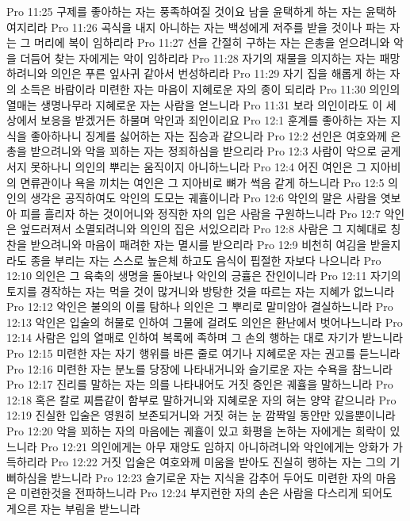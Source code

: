 Pro 11:25  구제를 좋아하는 자는 풍족하여질 것이요 남을 윤택하게 하는 자는 윤택하여지리라
Pro 11:26  곡식을 내지 아니하는 자는 백성에게 저주를 받을 것이나 파는 자는 그 머리에 복이 임하리라
Pro 11:27  선을 간절히 구하는 자는 은총을 얻으려니와 악을 더듬어 찾는 자에게는 악이 임하리라
Pro 11:28  자기의 재물을 의지하는 자는 패망하려니와 의인은 푸른 잎사귀 같아서 번성하리라
Pro 11:29  자기 집을 해롭게 하는 자의 소득은 바람이라 미련한 자는 마음이 지혜로운 자의 종이 되리라
Pro 11:30  의인의 열매는 생명나무라 지혜로운 자는 사람을 얻느니라
Pro 11:31  보라 의인이라도 이 세상에서 보응을 받겠거든 하물며 악인과 죄인이리요
Pro 12:1  훈계를 좋아하는 자는 지식을 좋아하나니 징계를 싫어하는 자는 짐승과 같으니라
Pro 12:2  선인은 여호와께 은총을 받으려니와 악을 꾀하는 자는 정죄하심을 받으리라
Pro 12:3  사람이 악으로 굳게 서지 못하나니 의인의 뿌리는 움직이지 아니하느니라
Pro 12:4  어진 여인은 그 지아비의 면류관이나 욕을 끼치는 여인은 그 지아비로 뼈가 썩음 같게 하느니라
Pro 12:5  의인의 생각은 공직하여도 악인의 도모는 궤휼이니라
Pro 12:6  악인의 말은 사람을 엿보아 피를 흘리자 하는 것이어니와 정직한 자의 입은 사람을 구원하느니라
Pro 12:7  악인은 엎드러져서 소멸되려니와 의인의 집은 서있으리라
Pro 12:8  사람은 그 지혜대로 칭찬을 받으려니와 마음이 패려한 자는 멸시를 받으리라
Pro 12:9  비천히 여김을 받을지라도 종을 부리는 자는 스스로 높은체 하고도 음식이 핍절한 자보다 나으니라
Pro 12:10  의인은 그 육축의 생명을 돌아보나 악인의 긍휼은 잔인이니라
Pro 12:11  자기의 토지를 경작하는 자는 먹을 것이 많거니와 방탕한 것을 따르는 자는 지혜가 없느니라
Pro 12:12  악인은 불의의 이를 탐하나 의인은 그 뿌리로 말미암아 결실하느니라
Pro 12:13  악인은 입술의 허물로 인하여 그물에 걸려도 의인은 환난에서 벗어나느니라
Pro 12:14  사람은 입의 열매로 인하여 복록에 족하며 그 손의 행하는 대로 자기가 받느니라
Pro 12:15  미련한 자는 자기 행위를 바른 줄로 여기나 지혜로운 자는 권고를 듣느니라
Pro 12:16  미련한 자는 분노를 당장에 나타내거니와 슬기로운 자는 수욕을 참느니라
Pro 12:17  진리를 말하는 자는 의를 나타내어도 거짓 증인은 궤휼을 말하느니라
Pro 12:18  혹은 칼로 찌름같이 함부로 말하거니와 지혜로운 자의 혀는 양약 같으니라
Pro 12:19  진실한 입술은 영원히 보존되거니와 거짓 혀는 눈 깜짝일 동안만 있을뿐이니라
Pro 12:20  악을 꾀하는 자의 마음에는 궤휼이 있고 화평을 논하는 자에게는 희락이 있느니라
Pro 12:21  의인에게는 아무 재앙도 임하지 아니하려니와 악인에게는 앙화가 가득하리라
Pro 12:22  거짓 입술은 여호와께 미움을 받아도 진실히 행하는 자는 그의 기뻐하심을 받느니라
Pro 12:23  슬기로운 자는 지식을 감추어 두어도 미련한 자의 마음은 미련한것을 전파하느니라
Pro 12:24  부지런한 자의 손은 사람을 다스리게 되어도 게으른 자는 부림을 받느니라
